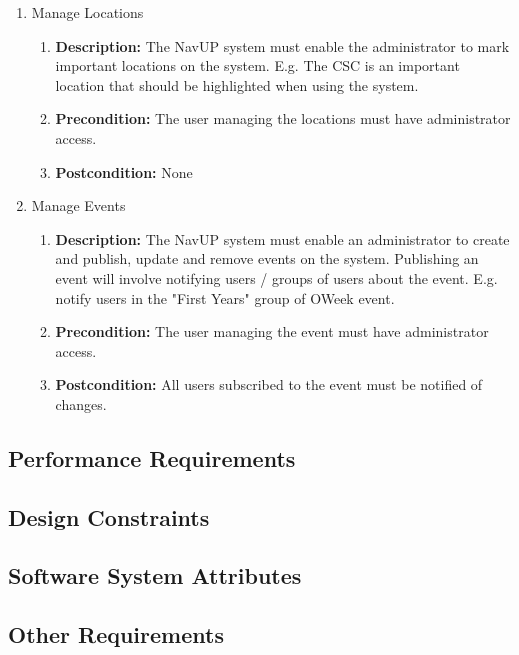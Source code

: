 \documentclass{article}
\begin{document}
\begin{enumerate}
\begin{enumerate}
\begin{enumerate}
		\end{enumerate}
		
		\item Manage Locations
		\begin{enumerate}
			\item \textbf{Description:} The NavUP system must enable the administrator to mark important locations on the system. E.g. The CSC is an important location that should be highlighted when using the system. 
			\item \textbf{Precondition:} The user managing the locations must have administrator access. 
			\item \textbf{Postcondition:} None			
		\end{enumerate}
		
		\item Manage Events
		\begin{enumerate}
			\item \textbf{Description:} The NavUP system must enable an administrator to create and publish, update and remove events on the system. Publishing an event will involve notifying users / groups of users about the event. E.g. notify users in the "First Years" group of OWeek event. 
			\item \textbf{Precondition:} The user managing the event must have administrator access. 
			\item \textbf{Postcondition:} All users subscribed to the event must be notified of changes.  \newline			
		\end{enumerate}	
		
	\end{enumerate}
	
	\end{enumerate}
	
	
	
	\subsection{Performance Requirements}
	\subsection{Design Constraints}
	\subsection{Software System Attributes}
	\subsection{Other Requirements}
\end{document}
